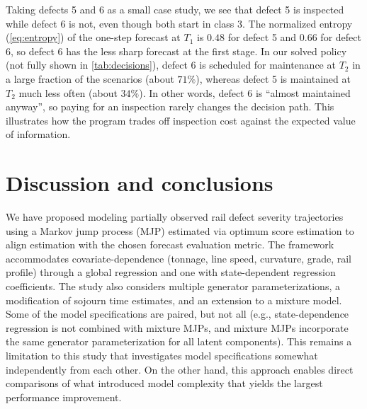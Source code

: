 Taking defects 5 and 6 as a small case study, we see that defect 5 is inspected while defect 6 is not, even though both start in class $3$. The normalized entropy (\cref{eq:entropy}) of the one-step forecast at $T_1$ is $0.48$ for defect 5 and $0.66$ for defect 6, so defect 6 has the less sharp forecast at the first stage. %
In our solved policy (not fully shown in \cref{tab:decisions}), defect 6 is scheduled for maintenance at $T_2$ in a large fraction of the scenarios (about $71\%$), whereas defect 5 is maintained at $T_2$ much less often (about $34\%$). In other words, defect 6 is ``almost maintained anyway'', so paying for an inspection rarely changes the decision path. This illustrates how the program trades off inspection cost against the expected value of information.





\section{Discussion and conclusions} \label{sec:conclusion}
We have proposed modeling partially observed rail defect severity trajectories using a Markov jump process (MJP) estimated via optimum score estimation to align estimation with the chosen forecast evaluation metric. The framework accommodates covariate-dependence (tonnage, line speed, curvature, grade, rail profile) through a global regression and one with state-dependent regression coefficients. The study also considers multiple generator parameterizations, a modification of sojourn time estimates, and an extension to a mixture model.
Some of the model specifications are paired, but not all (e.g., state-dependence regression is not combined with mixture MJPs, and mixture MJPs incorporate the same generator parameterization for all latent components). This remains a limitation to this study that investigates model specifications somewhat independently from each other. On the other hand, this approach enables direct comparisons of what introduced model complexity that yields the largest performance improvement.

